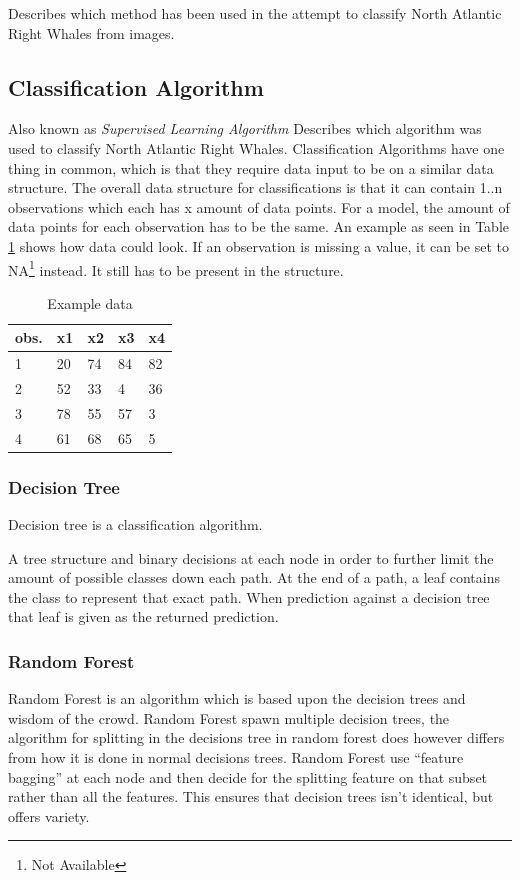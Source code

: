 Describes which method has been used in the attempt to classify North Atlantic Right Whales from images.

\subsection{Classification Algorithm}
Also known as \emph{Supervised Learning Algorithm}
Describes which algorithm was used to classify North Atlantic Right Whales. Classification Algorithms have one thing in common, which is that they require data input to be on a similar data structure.
The overall data structure for classifications is that it can contain 1..n observations which each has x amount of data points. For a model, the amount of data points for each observation has to be the same. An example as seen in Table \ref{tab:example data} shows how data could look.
If an observation is missing a value, it can be set to NA\footnote{Not Available} instead. It still has to be present in the structure.

\begin{table}
  \centering
  \caption{Example data}
  \label{tab:example data}
  \begin{tabularx}{\linewidth}{|l|X|X|X|X|} \hline
    obs. & x1 & x2 & x3 & x4 \\ \hline
    1    & 20 & 74 & 84 & 82 \\ \hline
    2    & 52 & 33 & 4  & 36 \\ \hline
    3    & 78 & 55 & 57 & 3  \\ \hline
    4    & 61 & 68 & 65 & 5  \\ \hline
  \end{tabularx}
\end{table}

\subsubsection{Decision Tree}
Decision tree is a classification algorithm. 

A tree structure and binary decisions at each node in order to further limit the amount of possible classes down each path.
At the end of a path, a leaf contains the class to represent that exact path.
When prediction against a decision tree that leaf is given as the returned prediction.

\subsubsection{Random Forest}
Random Forest is an algorithm which is based upon the decision trees and wisdom of the crowd.
Random Forest spawn multiple decision trees, the algorithm for splitting in the decisions tree in random forest does however differs from how it is done in normal decisions trees.
Random Forest use ``feature bagging'' at each node and then decide for the splitting feature on that subset rather than all the features. This ensures that decision trees isn't identical, but offers variety.

